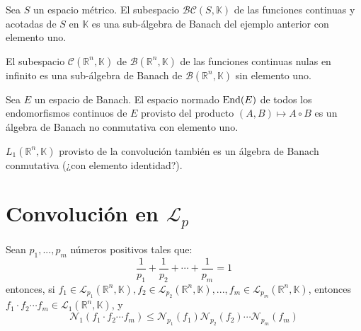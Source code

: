 \documentclass[12pt]{report}
\theoremstyle{largebreak}
\newcommand{\N}[2]{\ensuremath{\mathcal{N}_{#1}\left(#2\right)}}
\begin{document}
    \begin{exa}
        Sea $S$ un espacio métrico. El subespacio $\mathcal{BC}(S,\mathbb{K})$ de las funciones continuas y acotadas de $S$ en $\mathbb{K}$ es una sub-álgebra de Banach del ejemplo anterior con elemento uno.
    \end{exa}

    \begin{exa}
        El subespacio $\mathcal{C}(\mathbb{R}^n,\mathbb{K})$ de $\mathcal{B}(\mathbb{R}^n,\mathbb{K})$ de las funciones continuas nulas en infinito es una sub-álgebra de Banach de $\mathcal{B}(\mathbb{R}^n,\mathbb{K})$ sin elemento uno.
    \end{exa}

    \begin{exa}
        Sea $E$ un espacio de Banach. El espacio normado $\textup{End}(E)$ de todos los endomorfismos continuos de $E$ provisto del producto $(A,B)\mapsto A\circ B $ es un álgebra de Banach no conmutativa con elemento uno.
    \end{exa}

    \begin{exa}
        $L_1(\mathbb{R}^n,\mathbb{K})$ provisto de la convolución también es un álgebra de Banach conmutativa (¿con elemento identidad?).
    \end{exa}

    \section{Convolución en $\mathcal{L}_p$}

    \begin{theor}
        Sean $p_1,...,p_m$ números positivos tales que:
        \begin{equation*}
            \frac{1}{p_1}+\frac{1}{p_2}+\cdots+\frac{1}{p_m}=1
        \end{equation*}
        entonces, si $f_1\in\mathcal{L}_{p_1}(\mathbb{R}^n,\mathbb{K}),f_2\in\mathcal{L}_{p_2}(\mathbb{R}^n,\mathbb{K}),...,f_m\in\mathcal{L}_{p_m}(\mathbb{R}^n,\mathbb{K})$, entonces $f_1\cdot f_2\cdots f_m\in \mathcal{L}_1(\mathbb{R}^n,\mathbb{K})$, y
        \begin{equation*}
            \N{1}{f_1\cdot f_2\cdots f_m}\leq \N{p_1}{f_1}\N{p_2}{f_2}\cdots\N{p_m}{f_m}
        \end{equation*}
    \end{theor}
\end{document}
